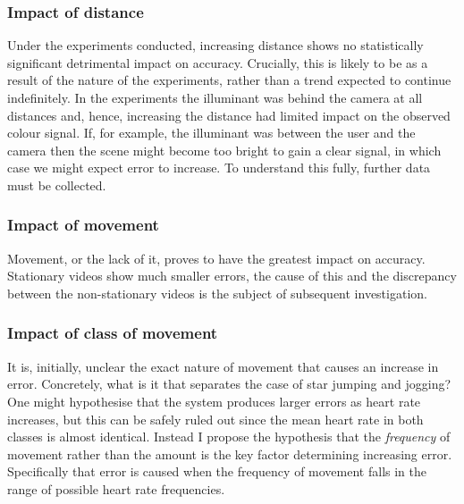 \subsubsection{Impact of distance}
Under the experiments conducted, increasing distance shows no statistically significant detrimental impact on accuracy.
Crucially, this is likely to be as a result of the nature of the experiments, rather than a trend expected to continue indefinitely.
In the experiments the illuminant was behind the camera at all distances and, hence, increasing the distance had limited impact on the observed colour signal.
If, for example, the illuminant was between the user and the camera then the scene might become too bright to gain a clear signal, in which case we might expect error to increase.
To understand this fully, further data must be collected.
\begin{figure}[H]
    \centering
\end{figure}

\subsubsection{Impact of movement}
Movement, or the lack of it, proves to have the greatest impact on accuracy. Stationary videos show much smaller errors, the cause of this and the discrepancy between
the non-stationary videos is the subject of subsequent investigation.
\begin{figure}[H]
    \centering
    \label{fig:move_err}
\end{figure}

\subsubsection{Impact of class of movement}
It is, initially, unclear the exact nature of movement that causes an increase in error. Concretely, what is it that separates the case of star jumping and jogging? 
One might hypothesise that the system produces larger errors as heart rate increases, but this can be safely ruled out since the mean heart rate in both classes is almost identical.
Instead I propose the hypothesis that the \textit{frequency} of movement rather than the amount is the key factor determining increasing error. Specifically that error is caused when the frequency of movement
falls in the range of possible heart rate frequencies.


